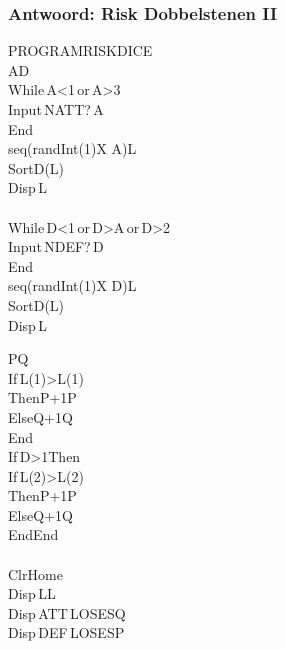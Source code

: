 \begin{frame}
\frametitle{Antwoord: Risk Dobbelstenen II}

\vspace{-0.5cm}
\hspace{-1cm}
\begin{minipage}{0.5\textwidth}
\begin{ticalc}[4cm]
	PROGRAM\:RISKDICE\\%
	\>A\>D\\%
	\:While\,A<1\,or\,A>3\\%
	\:Input\,\qt NATT?\,\qt\comma A\\%
	\:End\\%
	\:seq(randInt(1)\comma X \comma A)\>L\\%
	\:SortD(L)\\%
	\:Disp\,L\\%
	\:\\%
	\:While\,D<1\,or\,D>A\,or\,D>2\\%
	\:Input\,\qt NDEF?\,\qt\comma D\\%
	\:End\\%
	\:seq(randInt(1)\comma X \comma D)\>L\\%
	\:SortD(L)\\%
	\:Disp\,L\\%
	\:
\end{ticalc}
\end{minipage}
\begin{minipage}{0.5\textwidth}%
\begin{ticalc}[4.2cm]
	\>P\>Q\\%
	\:If\,L(1)>L(1)\\%
	\:Then\:P+1\>P\\%
	\:Else\:Q+1\>Q\\%
	\:End\\%
	\:If\,D>1\:Then\\%
	\:If\,L(2)>L(2)\\%
	\:Then\:P+1\>P\\%
	\:Else\:Q+1\>Q\\%
	\:End\:End\\%
	\:\\%
	\:ClrHome\\%
	\:Disp\,L\comma L\\%
	\:Disp\,\qt ATT\,LOSES\:\qt\comma Q\\%
	\:Disp\,\qt DEF\,LOSES\:\qt\comma P	
\end{ticalc}
\end{minipage}

\end{frame}
